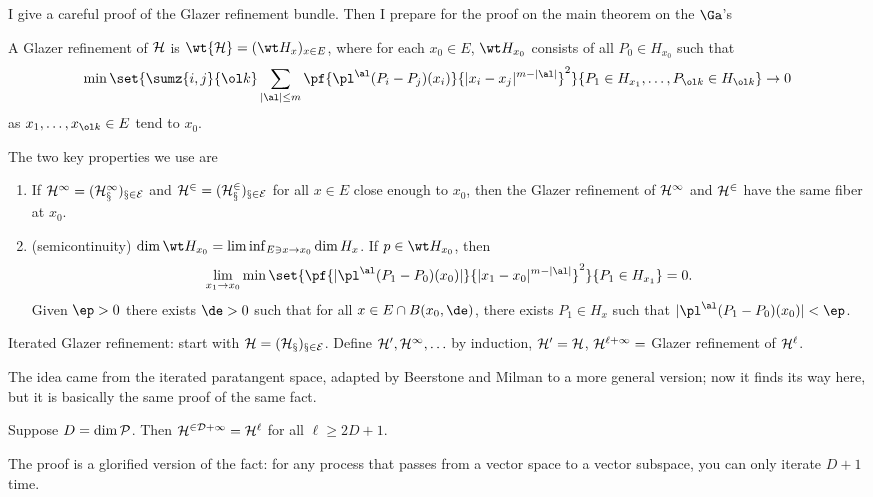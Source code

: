 
I give a careful proof of the Glazer refinement bundle. Then I prepare for the proof on the main theorem on the $\Ga$'s

A Glazer refinement of $\cal H$ is $\wt{\cal H}=(\wt H_x)_{x\in E}$, where for each $x_0\in E$, $\wt H_{x_0}$ consists of all $P_0\in H_{x_0}$ such that 
\begin{align}
\min
\set{
\sumz{i,j}{\ol k} \sum_{|\al|\le m}
\pf{\pl^\al(P_i-P_j)(x_i)}{|x_i-x_j|^{m-|\al|}}^2
}{
P_1\in H_{x_1},\ldots, P_{\ol k}\in H_{\ol k}
}\to 0 
\end{align}
 as $x_1,\ldots, x_{\ol k}\in E$ tend to $x_0$. 
 
The two key properties we use are
\begin{enumerate}
\item
If $\cal H^1 = (H_x^1)_{x\in E}$ and $\cal H^2 = (H_x^2)_{x\in E}$  for all $x\in E$ close enough to $x_0$, then the Glazer refinement of $\cal H^1$ and $\cal H^2$ have the same fiber at $x_0$.
\item
(semicontinuity)
$\dim \wt H_{x_0} = \liminf_{E\ni x\to x_0} \dim H_x$.
If $p\in \wt H_{x_0}$, then 
\begin{align}
\lim_{x_1\to x_0}\min \set{
\pf{|\pl^\al(P_1-P_0)(x_0)|}{|x_1-x_0|^{m-|\al|}}^2
}{P_1\in H_{x_1}}=0.
\end{align}
Given $\ep>0$ there exists $\de>0$ such that for all $x\in E\cap B(x_0,\de)$, there exists $P_1\in H_x$ such that $|\pl^\al (P_1-P_0)(x_0)|<\ep$.
\end{enumerate}

Iterated Glazer refinement: start with $\cal H=(H_x)_{x\in E}$. Define $\cal H^0,\cal H^1,\ldots$ by induction, $\cal H^0=\cal H$, $\cal H^{\cal \ell+1}=$ Glazer refinement of $\cal H^\ell$. 

The idea came from the iterated paratangent space, adapted by Beerstone and Milman to a more general version; now it finds its way here, but it is basically the same proof of the same fact.
\begin{lem}
Suppose $D=\dim\cal P$. Then $\cal H^{2D+1} = \cal H^\ell$ for all $\ell\ge 2D+1$.
\end{lem}
The proof is a glorified version of the fact: for any process that passes from a vector space to a vector subspace, you can only iterate $D+1$ time.

